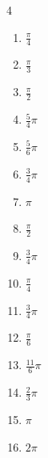 \begin{multicols}{4}
\begin{enumerate}
  \item $\displaystyle \frac{\pi}{4}$

  \item $\displaystyle \frac{\pi}{3}$

  \item $\displaystyle \frac{\pi}{2}$

  \item $\displaystyle \frac{5}{4}\pi$

  \item $\displaystyle \frac{5}{6}\pi$

  \item $\displaystyle \frac{3}{4}\pi$

  \item $\displaystyle \pi$

  \item $\displaystyle \frac{\pi}{2}$

  \item $\displaystyle \frac{3}{4}\pi$

  \item $\displaystyle \frac{\pi}{4}$

  \item $\displaystyle \frac{3}{4}\pi$

  \item $\displaystyle \frac{\pi}{6}$

  \item $\displaystyle \frac{11}{6}\pi$

  \item $\displaystyle \frac{2}{3}\pi$

  \item $\displaystyle \pi$

  \item $\displaystyle 2\pi$


\end{enumerate}
\end{multicols}
